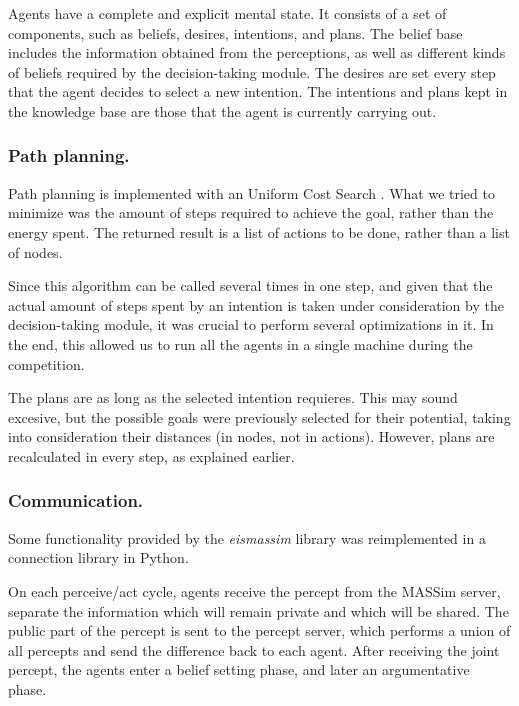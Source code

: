 \documentclass{llncs2e/llncs}
\begin{document}
    Agents have a complete and explicit mental state. It consists of a set of 
    components, such as beliefs, desires, intentions, and plans. 
    The belief base includes the information obtained from the perceptions, as
    well as different kinds of beliefs required by the decision-taking module.
    The desires are set every step that the agent decides to select a new intention.
    The intentions and plans kept in the knowledge base are those that the agent
    is currently carrying out.
    
\subsubsection{Path planning.}

    Path planning is implemented with an Uniform Cost Search 
    \cite{Russell:2003:AIM:773294}. 
    What we tried to minimize was the amount of steps required to achieve the 
    goal, rather than the energy spent. 
    The returned result is a list of actions to be done, rather than a list of 
    nodes.
    
    Since this algorithm can be called several times in one step, and given that the 
    actual amount of steps spent by an intention is taken under consideration by 
    the decision-taking module, it was crucial to perform several optimizations in 
    it. In the end, this allowed us to run all the agents in a single machine  
    during the competition.
    
    The plans are as long as the selected intention requieres. This may 
    sound excesive, but the possible goals were previously selected for their 
    potential, taking into consideration their distances (in nodes, not in 
    actions). However, plans are recalculated in every step, as explained earlier.    

\subsubsection{Communication.}

    Some functionality provided by the \textit{eismassim} library was
    reimplemented in a connection library in Python.

    On each perceive/act cycle, agents receive the percept from the MASSim server, 
    separate the information which will remain private and which will be shared. 
    The public part of the percept is sent to the percept server, which performs a 
    union of all percepts and send the difference back to each agent. After 
    receiving the joint percept, the agents enter a belief setting phase, and 
    later an argumentative phase.
    
\end{document}
